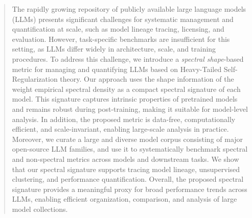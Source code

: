 \begin{abstract}

The rapidly growing repository of publicly available large language models (LLMs) presents significant challenges for systematic management and quantification at scale, such as model lineage tracing, licensing, and evaluation. However, task-specific benchmarks are insufficient for this setting, as LLMs differ widely in architecture, scale, and training procedures. To address this challenge, we introduce a \emph{spectral shape}-based metric for managing and quantifying LLMs based on Heavy-Tailed Self-Regularization theory. Our approach uses the shape information of the weight empirical spectral density as a compact spectral signature of each model. This signature captures intrinsic properties of pretrained models and remains robust during post-training, making it suitable for model-level analysis. In addition, the proposed metric is data-free, computationally efficient, and scale-invariant, enabling large-scale analysis in practice. Moreover, we curate a large and diverse model corpus consisting of major open-source LLM families, and use it to systematically benchmark spectral and non-spectral metrics across models and downstream tasks. We show that our spectral signature supports tracing model lineage, unsupervised clustering, and performance quantification. Overall, the proposed spectral signature provides a meaningful proxy for broad performance trends across LLMs, enabling efficient organization, comparison, and analysis of large model collections.

\end{abstract}